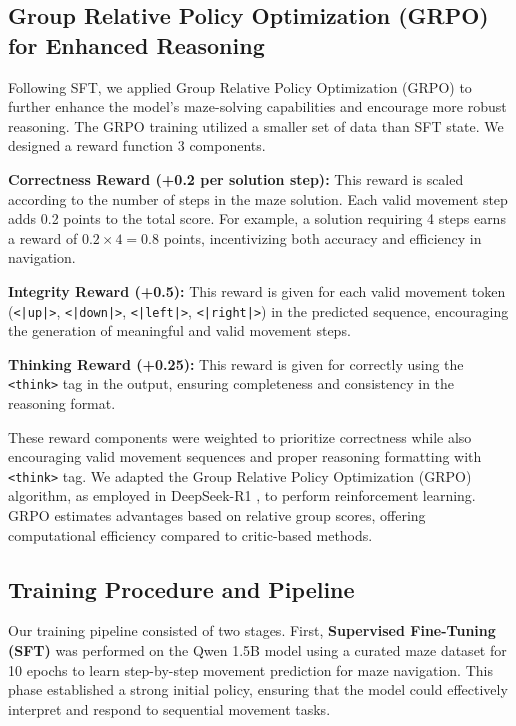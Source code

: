 \subsection{Group Relative Policy Optimization (GRPO) for Enhanced Reasoning}
\label{subsec:grpo}

Following SFT, we applied Group Relative Policy Optimization (GRPO) to further enhance the model's maze-solving capabilities and encourage more robust reasoning. The GRPO training utilized a smaller set of data than SFT state. We designed a reward function 3 components.

\textbf{Correctness Reward (+0.2 per solution step):} This reward is scaled according to the number of steps in the maze solution. Each valid movement step adds 0.2 points to the total score. For example, a solution requiring 4 steps earns a reward of \(0.2 \times 4 = 0.8\) points, incentivizing both accuracy and efficiency in navigation.

\textbf{Integrity Reward (+0.5):} This reward is given for each valid movement token (\texttt{<|up|>}, \texttt{<|down|>}, \texttt{<|left|>}, \texttt{<|right|>}) in the predicted sequence, encouraging the generation of meaningful and valid movement steps.

\textbf{Thinking Reward (+0.25):} This reward is given for correctly using the \texttt{<think>} tag in the output, ensuring completeness and consistency in the reasoning format.


These reward components were weighted to prioritize correctness while also encouraging valid movement sequences and proper reasoning formatting with \texttt{<think>} tag. We adapted the Group Relative Policy Optimization (GRPO) algorithm, as employed in DeepSeek-R1 \citep{Guo2025DeepSeekR1}, to perform reinforcement learning. GRPO estimates advantages based on relative group scores, offering computational efficiency compared to critic-based methods.


\subsection{Training Procedure and Pipeline}
\label{subsec:training_pipeline}

Our training pipeline consisted of two stages. First, \textbf{Supervised Fine-Tuning (SFT)} was performed on the Qwen 1.5B model using a curated maze dataset for 10 epochs to learn step-by-step movement prediction for maze navigation. This phase established a strong initial policy, ensuring that the model could effectively interpret and respond to sequential movement tasks.  

